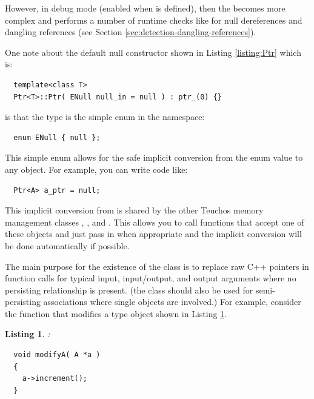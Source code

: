 \documentclass[pdf,ps2pdf,11pt]{SANDreport}
\newtheorem{listing}{Listing}
\begin{document}
However, in debug mode (enabled when {} is
defined), then the {} becomes more complex and performs a
number of runtime checks like for null dereferences and dangling
references (see Section {}\ref{sec:detection-dangling-references}).

One note about the default null constructor shown in Listing
{}\ref{listing:Ptr} which is:

{\small\begin{verbatim}
  template<class T>
  Ptr<T>::Ptr( ENull null_in = null ) : ptr_(0) {}
\end{verbatim}}

{}\noindent{}is that the type {} is the simple enum in
the {} namespace:

{\small\begin{verbatim}
  enum ENull { null };
\end{verbatim}}

This simple enum allows for the safe implicit conversion from the enum
value {} to any {} object.  For example,
you can write code like:

{\small\begin{verbatim}
  Ptr<A> a_ptr = null;
\end{verbatim}}

This implicit conversion from {} is shared by the other
Teuchos memory management classes {},
{}, and {}.  This allows you
to call functions that accept one of these objects and just pass in
{} when appropriate and the implicit conversion will be
done automatically if possible.

The main purpose for the existence of the {} class is to
replace raw C++ pointers in function calls for typical input,
input/output, and output arguments where no persisting relationship is
present.  (the class {} should also be used for
semi-persisting associations where single objects are involved.)  For
example, consider the function that modifies a type {}
object shown in Listing {}\ref{listing:modifyA-rawPtr}.

\begin{listing}:\\
\label{listing:modifyA-rawPtr}
{\small\begin{verbatim}
  void modifyA( A *a )
  {
    a->increment();
  }
\end{verbatim}}
\end{listing}
\end{document}
